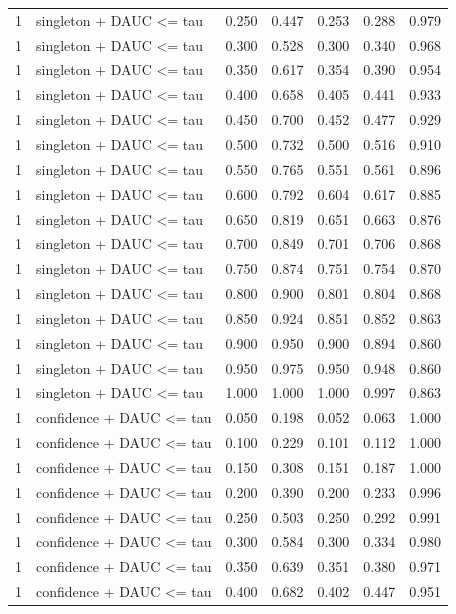 \begin{tabular}{rlrrrrr}
1 & singleton + DAUC <= tau & 0.250 & 0.447 & 0.253 & 0.288 & 0.979 \\
1 & singleton + DAUC <= tau & 0.300 & 0.528 & 0.300 & 0.340 & 0.968 \\
1 & singleton + DAUC <= tau & 0.350 & 0.617 & 0.354 & 0.390 & 0.954 \\
1 & singleton + DAUC <= tau & 0.400 & 0.658 & 0.405 & 0.441 & 0.933 \\
1 & singleton + DAUC <= tau & 0.450 & 0.700 & 0.452 & 0.477 & 0.929 \\
1 & singleton + DAUC <= tau & 0.500 & 0.732 & 0.500 & 0.516 & 0.910 \\
1 & singleton + DAUC <= tau & 0.550 & 0.765 & 0.551 & 0.561 & 0.896 \\
1 & singleton + DAUC <= tau & 0.600 & 0.792 & 0.604 & 0.617 & 0.885 \\
1 & singleton + DAUC <= tau & 0.650 & 0.819 & 0.651 & 0.663 & 0.876 \\
1 & singleton + DAUC <= tau & 0.700 & 0.849 & 0.701 & 0.706 & 0.868 \\
1 & singleton + DAUC <= tau & 0.750 & 0.874 & 0.751 & 0.754 & 0.870 \\
1 & singleton + DAUC <= tau & 0.800 & 0.900 & 0.801 & 0.804 & 0.868 \\
1 & singleton + DAUC <= tau & 0.850 & 0.924 & 0.851 & 0.852 & 0.863 \\
1 & singleton + DAUC <= tau & 0.900 & 0.950 & 0.900 & 0.894 & 0.860 \\
1 & singleton + DAUC <= tau & 0.950 & 0.975 & 0.950 & 0.948 & 0.860 \\
1 & singleton + DAUC <= tau & 1.000 & 1.000 & 1.000 & 0.997 & 0.863 \\
1 & confidence + DAUC <= tau & 0.050 & 0.198 & 0.052 & 0.063 & 1.000 \\
1 & confidence + DAUC <= tau & 0.100 & 0.229 & 0.101 & 0.112 & 1.000 \\
1 & confidence + DAUC <= tau & 0.150 & 0.308 & 0.151 & 0.187 & 1.000 \\
1 & confidence + DAUC <= tau & 0.200 & 0.390 & 0.200 & 0.233 & 0.996 \\
1 & confidence + DAUC <= tau & 0.250 & 0.503 & 0.250 & 0.292 & 0.991 \\
1 & confidence + DAUC <= tau & 0.300 & 0.584 & 0.300 & 0.334 & 0.980 \\
1 & confidence + DAUC <= tau & 0.350 & 0.639 & 0.351 & 0.380 & 0.971 \\
1 & confidence + DAUC <= tau & 0.400 & 0.682 & 0.402 & 0.447 & 0.951 \\

\end{tabular}
